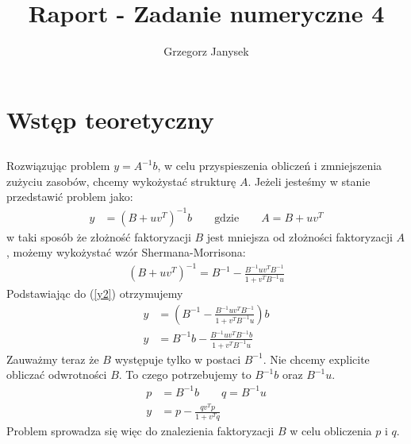 \documentclass[11pt]{extarticle}
\author{Grzegorz Janysek}
\title{Raport - Zadanie numeryczne 4}
\begin{document}
	\maketitle

	\section{Wstęp teoretyczny}

	\subsection{}
	Rozwiązując problem \( y=A^{-1}b\), w celu przyspieszenia obliczeń i zmniejszenia zużyciu zasobów, chcemy wykożystać strukturę \( A \).
	Jeżeli jesteśmy w stanie przedstawić problem jako:
	\begin{align}
		\label{y2}
		y &= (B + uv^T)^{-1}b \qquad \text{gdzie} \qquad A = B + uv^T
	\end{align}
	w taki sposób że złożność faktoryzacji \(B\) jest mniejsza od złożności faktoryzacji \(A\),
	możemy wykożystać wzór Shermana-Morrisona:
	\begin{align}
		(B + uv^T)^{-1} = B^{-1} - \frac{ B^{-1}uv^TB^{-1} }{ 1 + v^TB^{-1}u }
	\end{align}
	Podstawiając do (\ref{y2}) otrzymujemy
	\begin{align}
		y &= \left( B^{-1} - \frac{ B^{-1}uv^TB^{-1} }{ 1 + v^TB^{-1}u } \right)b \\[12pt]
		y &= B^{-1}b - \frac{ B^{-1}uv^TB^{-1}b }{ 1 + v^TB^{-1}u }
	\end{align}
	Zauważmy teraz że \(B\) występuje tylko w postaci \(B^{-1}\).
	Nie chcemy explicite obliczać odwrotności \(B\).
	To czego potrzebujemy to \(B^{-1}b\) oraz \(B^{-1}u\).
	\begin{align}
		p &= B^{-1}b \qquad q = B^{-1}u \\[12pt]
		y &= p - \frac{ qv^Tp }{ 1 + v^Tq }
	\end{align}
	Problem sprowadza się więc do znalezienia faktoryzacji \(B\) w celu obliczenia \(p\) i \(q\).

	\pagebreak
\end{document}

